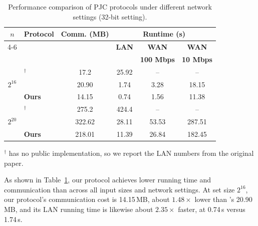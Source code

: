 \begin{table}[!htbp]
\centering
\caption{Performance comparison of PJC protocols under different network settings (32-bit setting).}
\label{tab:pjc-comparison}

\setlength{\tabcolsep}{3.5pt}
\renewcommand{\arraystretch}{1.05}
\small

\begin{tabular}{c l c c c c}
\toprule

\multirow{2}{*}{$n$}
&
\multirow{2}{*}{\textbf{Protocol}}
&
\multirow{2}{*}{\textbf{Comm. (MB)}}
&
\multicolumn{3}{c}{\textbf{Runtime (s)}}
\\

\cmidrule(lr){4-6}

&
&
&
\textbf{LAN}
&
\textbf{WAN}
&
\textbf{WAN}
\\[-2pt]

&
&
&
&
\textbf{100 Mbps}
&
\textbf{10 Mbps}
\\

\midrule

\multirow{3}{*}{$2^{16}$}
& \cite{CHI+23}$^\dagger$& 17.2 & 25.92 & -- & -- \\
& \cite{KLS26}&20.90&1.74&3.28&18.15\\
\cmidrule(lr){2-6}%
& \textbf{Ours}&14.15&0.74&1.56&11.38\\

\midrule

\multirow{3}{*}{$2^{20}$}
& \cite{CHI+23}$^\dagger$& 275.2 & 424.4 & -- & -- \\
& \cite{KLS26}&322.62&28.11&53.53&287.51\\
\cmidrule(lr){2-6}
& \textbf{Ours}&218.01&11.39&26.84&182.45\\

\bottomrule
\end{tabular}

\vspace{2pt}
\begin{minipage}{0.95\linewidth}
\footnotesize
$^\dagger$ \cite{CHI+23} has no public implementation, so we report the LAN numbers from the original paper.
\end{minipage}

\end{table}

As shown in Table~\ref{tab:pjc-comparison}, our protocol achieves lower
running time and communication than \cite{KLS26} across all input sizes
and network settings. At set size $2^{16}$, our protocol's communication
cost is 14.15\,MB, about $1.48\times$ lower than \cite{KLS26}'s
20.90\,MB, and its LAN running time is likewise about $2.35\times$
faster, at 0.74\,s versus 1.74\,s.
 
